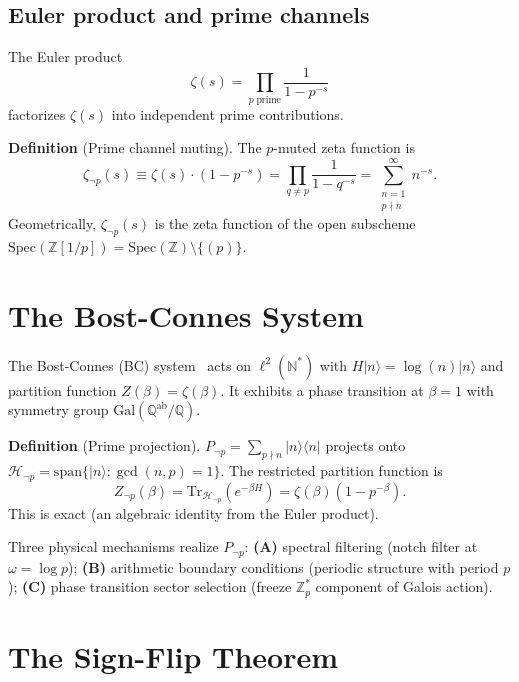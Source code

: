 \documentclass[11pt,a4paper]{article}
\newcommand{\Spec}{\mathrm{Spec}}
\newcommand{\Tr}{\mathrm{Tr}}
\newcommand{\Gal}{\mathrm{Gal}}
\newcommand{\Zp}{\mathbb{Z}[1/p]}
\begin{document}
\subsection{Euler product and prime channels}

The Euler product
\begin{equation}
  \zeta(s) = \prod_{p\;\mathrm{prime}} \frac{1}{1 - p^{-s}}
  \label{eq:euler}
\end{equation}
factorizes $\zeta(s)$ into independent prime contributions.

\noindent\textbf{Definition} (Prime channel muting).
The $p$-muted zeta function is
\begin{equation}
  \zeta_{\neg p}(s) \equiv \zeta(s)\cdot(1 - p^{-s})
  = \prod_{q \neq p} \frac{1}{1 - q^{-s}}
  = \sum_{\substack{n=1\\p\nmid n}}^{\infty} n^{-s}.
  \label{eq:muted}
\end{equation}
Geometrically, $\zeta_{\neg p}(s)$ is the zeta function of the
open subscheme $\Spec(\Zp) = \Spec(\mathbb{Z})\setminus\{(p)\}$.

\section{The Bost-Connes System}

The Bost-Connes (BC) system~\cite{BostConnes1995,ConnesMarcolli2006}
acts on $\ell^2(\mathbb{N}^*)$ with $H|n\rangle = \log(n)|n\rangle$
and partition function $Z(\beta) = \zeta(\beta)$.
It exhibits a phase transition at $\beta = 1$ with symmetry group
$\Gal(\mathbb{Q}^{\mathrm{ab}}/\mathbb{Q})$.

\noindent\textbf{Definition} (Prime projection).
$P_{\neg p} = \sum_{p\nmid n} |n\rangle\langle n|$ projects onto
$\mathcal{H}_{\neg p} = \mathrm{span}\{|n\rangle : \gcd(n,p) = 1\}$.
The restricted partition function is
\begin{equation}
  Z_{\neg p}(\beta) = \Tr_{\mathcal{H}_{\neg p}}(e^{-\beta H})
  = \zeta(\beta)(1 - p^{-\beta}).
\end{equation}
This is exact (an algebraic identity from the Euler product).

Three physical mechanisms realize $P_{\neg p}$:
\textbf{(A)} spectral filtering (notch filter at $\omega = \log p$);
\textbf{(B)} arithmetic boundary conditions (periodic structure with period $p$);
\textbf{(C)} phase transition sector selection (freeze $\mathbb{Z}_p^*$ component of Galois action).

\section{The Sign-Flip Theorem}
\end{document}
